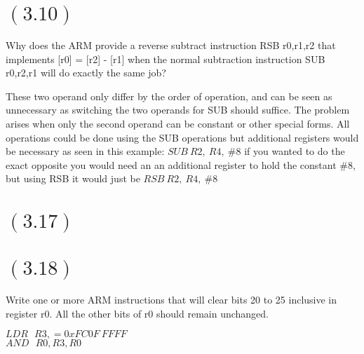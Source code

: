 \documentclass[letterpaper,12pt,titlepage]{article}
\begin{document}
\section*{$(3.10)$} Why does the ARM provide a reverse subtract instruction RSB r0,r1,r2 that implements [r0] = [r2] - [r1] when the normal subtraction instruction SUB r0,r2,r1 will do exactly the same job?
\begin{mdframed}[style=MyFrame]
These two operand only differ by the order of operation, and can be seen as unnecessary as switching the two operands for SUB should suffice. The problem arises when only the second operand can be constant or other special forms. All operations could be done using the SUB operations but additional registers would be necessary as seen  in this example: $SUB~R2,~R4,~\#8$ if you wanted to do the exact opposite you would need an an additional register to hold the constant $\#8$, but using RSB it would just be $RSB~R2,~R4,~\#8$
\end{mdframed}

\section*{$(3.17)$} 

\newpage
\section*{$(3.18)$} Write one or more ARM instructions that will clear bits 20 to 25 inclusive in register r0. All the other bits of r0 should remain unchanged.
\begin{mdframed}[style=MyFrame]
$LDR~~~ R3, = 0xFC0F~FFFF $\\
$AND~~~ R0,R3,R0$
\end{mdframed}
\end{document}
